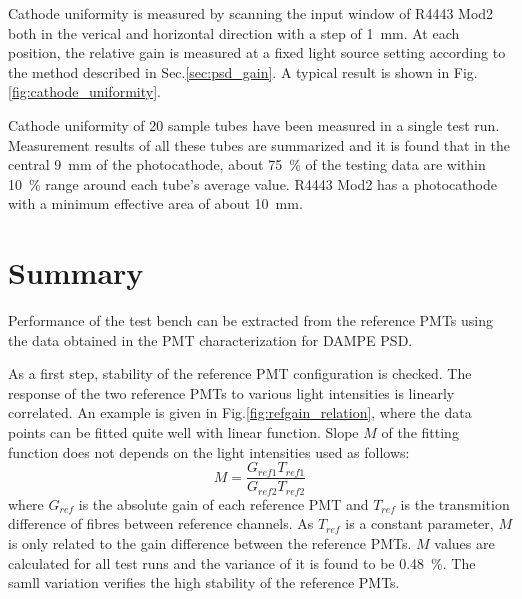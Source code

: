 \documentclass[review,number,sort&compress]{elsarticle}
\begin{document}

Cathode uniformity is measured by scanning the input window of R4443 Mod2 both in the verical and horizontal direction with a step of \SI{1}{\milli\meter}.
At each position, the relative gain is measured at a fixed light source setting according to the method described in Sec.\ref{sec:psd_gain}.
A typical result is shown in Fig.\ref{fig:cathode_uniformity}.

Cathode uniformity of 20 sample tubes have been measured in a single test run.
Measurement results of all these tubes are summarized and it is found that in the central \SI{9}{\milli\meter} of the photocathode, about \SI{75}{\percent} of the testing data are within \textpm\SI{10}{\percent} range around each tube's average value.
R4443 Mod2 has a photocathode with a minimum effective area of about \SI{10}{\milli\meter}.

\section{Summary}
\label{sec:summary}

Performance of the test bench can be extracted from the reference PMTs using the data obtained in the PMT characterization for DAMPE PSD.

As a first step, stability of the reference PMT configuration is checked.
The response of the two reference PMTs to various light intensities is linearly correlated.
An example is given in Fig.\ref{fig:refgain_relation}, where the data points can be fitted quite well with linear function.
Slope $M$ of the fitting function does not depends on the light intensities used as follows:
\begin{equation}
 M = \frac{G_{ref1} T_{ref1}}{G_{ref2} T_{ref2}}
\end{equation}
where $G_{ref}$ is the absolute gain of each reference PMT and $T_{ref}$ is the transmition difference of fibres between reference channels.
As $T_{ref}$ is a constant parameter, $M$ is only related to the gain difference between the reference PMTs.
$M$ values are calculated for all test runs and the variance of it is found to be \SI{0.48}{\percent}.
The samll variation verifies the high stability of the reference PMTs.
\end{document}
